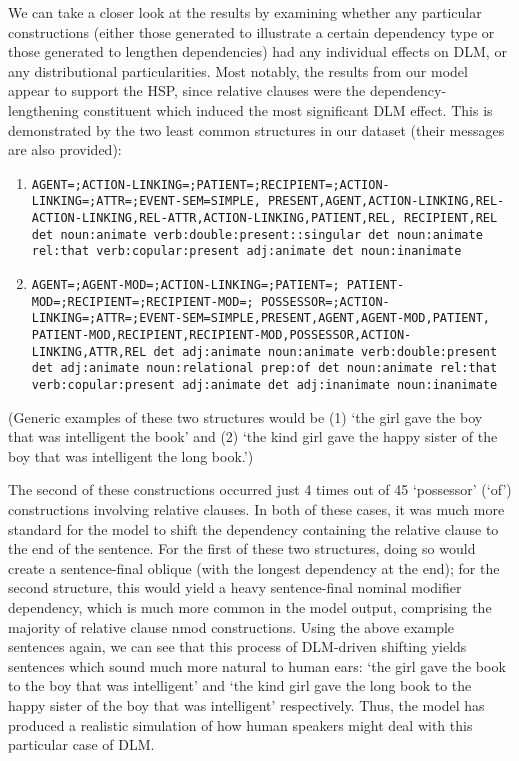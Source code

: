 \documentclass{article}
\begin{document}
We can take a closer look at the results by examining whether any particular constructions (either those generated to illustrate a certain dependency type or those generated to lengthen dependencies) had any individual effects on DLM, or any distributional particularities. Most notably, the results from our model appear to support the HSP, since relative clauses were the dependency-lengthening constituent which induced the most significant DLM effect. This is demonstrated by the two least common structures in our dataset (their messages are also provided):
\begin{enumerate}
	\item \texttt{AGENT=;ACTION-LINKING=;PATIENT=;RECIPIENT=;ACTION-LINKING=;ATTR=;EVENT-SEM=SIMPLE,
	PRESENT,AGENT,ACTION-LINKING,REL-ACTION-LINKING,REL-ATTR,ACTION-LINKING,PATIENT,REL,
	RECIPIENT,REL 	
	det noun:animate verb:double:present::singular det noun:animate rel:that verb:copular:present adj:animate det noun:inanimate}
	\item \texttt{AGENT=;AGENT-MOD=;ACTION-LINKING=;PATIENT=;
	PATIENT-MOD=;RECIPIENT=;RECIPIENT-MOD=;
	POSSESSOR=;ACTION-LINKING=;ATTR=;EVENT-SEM=SIMPLE,PRESENT,AGENT,AGENT-MOD,PATIENT,
	PATIENT-MOD,RECIPIENT,RECIPIENT-MOD,POSSESSOR,ACTION-LINKING,ATTR,REL 
	det adj:animate noun:animate verb:double:present det adj:animate noun:relational prep:of det noun:animate rel:that verb:copular:present adj:animate det adj:inanimate noun:inanimate}
\end{enumerate}
(Generic examples of these two structures would be (1) `the girl gave the boy that was intelligent the book' and (2) `the kind girl gave the happy sister of the boy that was intelligent the long book.')

The second of these constructions occurred just 4 times out of 45 `possessor' (`of') constructions involving relative clauses. In both of these cases, it was much more standard for the model to shift the dependency containing the relative clause to the end of the sentence. For the first of these two structures, doing so would create a sentence-final oblique (with the longest dependency at the end); for the second structure, this would yield a heavy sentence-final nominal modifier dependency, which is much more common in the model output, comprising the majority of relative clause nmod constructions. Using the above example sentences again, we can see that this process of DLM-driven shifting yields sentences which sound much more natural to human ears: `the girl gave the book to the boy that was intelligent' and `the kind girl gave the long book to the happy sister of the boy that was intelligent' respectively. Thus, the model has produced a realistic simulation of how human speakers might deal with this particular case of DLM. 
\end{document}
